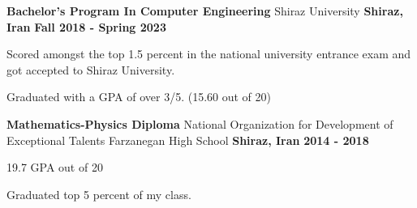 

\begin{cventries}

  \cventry
    {\textbf{Bachelor’s Program In Computer Engineering}} %
    {Shiraz University} %
    {\textbf{Shiraz, Iran}} %
    {\textbf{Fall 2018 - Spring 2023}} %
    {
    {
        \begin{cvitems} %
        \item {Scored amongst the top 1.5 percent in the national university entrance exam and got accepted to Shiraz University.}
        \item {Graduated with a GPA of over 3/5. (15.60 out of 20)}
        \end{cvitems}
    }
    }
      
  \cventry
    {\textbf{Mathematics-Physics Diploma}} %
    {National Organization for Development of Exceptional Talents Farzanegan High School} %
    {\textbf{Shiraz, Iran}} %
    {\textbf{2014 - 2018}} %
    {
      \begin{cvitems} %
        \item {19.7 GPA out of 20}
        \item {Graduated top 5 percent of my class.}
      \end{cvitems}
    }
\end{cventries}
